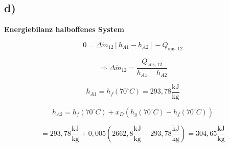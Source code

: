 

\subsection*{d)}

\textbf{Energiebilanz halboffenes System}

\[
0 = \Delta \dot{m}_{12} \left[ h_{A1} - h_{A2} \right] - Q_{\text{aus},12}
\]

\[
\Rightarrow \Delta \dot{m}_{12} = \frac{Q_{\text{aus},12}}{h_{A1} - h_{A2}}
\]

\[
h_{A1} = h_f(70^\circ C) = 293{,}78 \frac{\text{kJ}}{\text{kg}}
\]

\[
h_{A2} = h_f(70^\circ C) + x_D \left( h_g(70^\circ C) - h_f(70^\circ C) \right)
\]

\[
= 293{,}78 \frac{\text{kJ}}{\text{kg}} + 0{,}005 \left( 2662{,}8 \frac{\text{kJ}}{\text{kg}} - 293{,}78 \frac{\text{kJ}}{\text{kg}} \right) = 304{,}65 \frac{\text{kJ}}{\text{kg}}
\]
